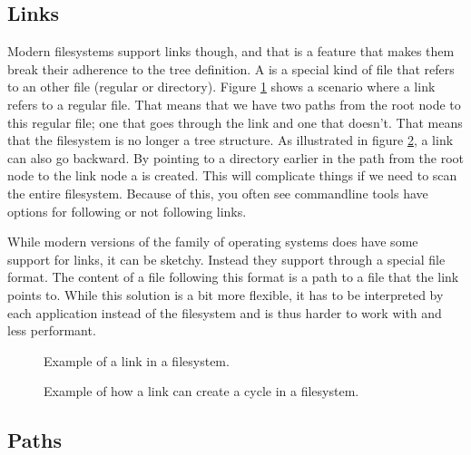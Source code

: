 \subsection{Links}

Modern filesystems support links though, and that is a feature that makes them break their adherence to the tree definition. A  is a special kind of file that refers to an other file (regular or directory). Figure \ref{fig:bs:fs:links} shows a scenario where a link refers to a regular file. That means that we have two paths from the root node to this regular file; one that goes through the link and one that doesn't. That means that the filesystem is no longer a tree structure. As illustrated in figure \ref{fig:bs:fs:cycles}, a link can also go backward. By pointing to a directory earlier in the path from the root node to the link node a  is created. This will complicate things if we need to scan the entire filesystem. Because of this, you often see commandline tools have options for following or not following links.

While modern versions of the  family of operating systems does have some support for links, it can be sketchy. Instead they support  through a special  file format. The content of a file following this format is a path to a file that the link points to. While this solution is a bit more flexible, it has to be interpreted by each application instead of the filesystem and is thus harder to work with and less performant.

\begin{figure}[tbp]
  
  \caption{Example of a link in a filesystem.}
  \label{fig:bs:fs:links}
\end{figure}

\begin{figure}[tbp]
  
  \caption{Example of how a link can create a cycle in a filesystem.}
  \label{fig:bs:fs:cycles}
\end{figure}

\subsection{Paths}

